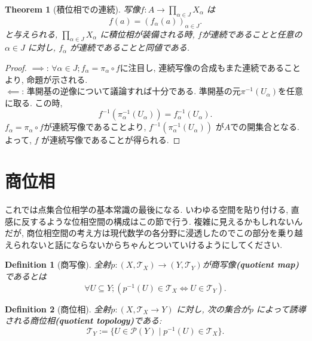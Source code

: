 \documentclass[dvipdfmx]{jbook}
\newtheorem{theorem}{Theorem}[section]
\newtheorem{definition}{Definition}[section]
\theoremstyle{remark}
\theoremstyle{plain}
\begin{document}
\begin{theorem}[積位相での連続]
	写像$f: A\to  \prod_{\alpha \in J} X_{\alpha}  $ は
	\[
	f(a) = (f_{\alpha}(a))_{\alpha \in J}
	.\] 
	と与えられる, $\prod_{\alpha \in J} X_{\alpha}  $ に積位相が装備される時, $f$が連続であることと任意の $\alpha \in J$ に対し, $f_{\alpha}$ が連続であることと同値である.
\end{theorem}

\begin{proof}
	$\implies$: $\forall \alpha \in J; f_{\alpha} = \pi_{\alpha} \circ f$に注目し, 連続写像の合成もまた連続であることより, 命題が示される.\\
	 $\impliedby$: 準開基の逆像について議論すれば十分である. 準開基の元$\pi^{-1}\left( U_{\alpha}\right) $を任意に取る. この時, 
	  \[
	 f^{-1}\left(\pi_{\alpha} ^{-1} \left( U_{\alpha}  \right) \right) = f_{\alpha}^{-1}\left( U_{\alpha} \right) 
	 .\] 
	 $f_{\alpha} = \pi_{\alpha} \circ f$が連続写像であることより, 
	 $f^{-1} \left( \pi_{\alpha} ^{-1}\left( U_{\alpha} \right)  \right) $ が$A$での開集合となる. 
	 よって,  $f$ が連続写像であることが得られる. 
\end{proof}

\section{商位相}

これでは点集合位相学の基本常識の最後になる. 
いわゆる空間を貼り付ける, 直感に反するような位相空間の構成はこの節で行う.
複雑に見えるかもしれないんだが, 商位相空間の考え方は現代数学の各分野に浸透したのでこの部分を乗り越えられないと話にならないからちゃんとついていけるようにしてください.

\begin{definition}[商写像]
	全射$p: \left( X, \mathcal{T}_X \right) \to \left( Y, \mathcal{T}_Y \right)  $が商写像\textbf{(quotient map)}であるとは
	\[
	\forall U \subseteq Y;\left( p^{-1}\left( U \right) \in \mathcal{T}_X \iff U \in \mathcal{T}_Y \right) 
	.\] 
\end{definition}

\begin{definition}[商位相]
	全射$p:\left( X,\mathcal{T}_X \to Y \right) $ に対し, 次の集合が$p$ によって誘導される商位相\textbf{(quotient topology)}である:
	\[
	\mathcal{T}_Y := \{U \in \mathcal{P}\left( Y \right)  \mid p^{-1}\left( U \right)  \in \mathcal{T}_X \} 
	.\] 
	
\end{definition}
\end{document}
